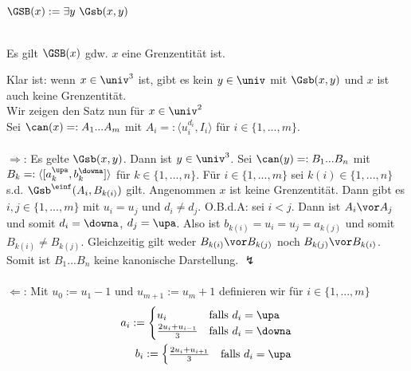
\begin{erin}\ \\
    $\GSB(x) := \exists y\ \Gsb(x,y)$
\end{erin}

\begin{satz}\ \\
    Es gilt $\GSB(x)$ gdw. $x$ eine Grenzentität ist.
\end{satz}

\begin{bew}
    Klar ist: wenn $x \in \univ^3$ ist, gibt es kein $y \in \univ$ mit $\Gsb(x,y)$ und $x$ ist auch keine Grenzentität.\\
    Wir zeigen den Satz nun für $x \in \univ^2$\\
    Sei $\can(x) =: A_1 ... A_m$ mit $A_i =: \langle u_i^{d_i}, I_i \rangle$ für $i \in \{1, ..., m\}$.\\ \ \\
    $\boldsymbol{\Rightarrow}$: 
    Es gelte $\Gsb(x,y)$.
    Dann ist $y \in \univ^3$.
    Sei $\can(y) =: B_1 ... B_n$ mit $B_k =: \langle [a_k^\upa,b_k^\downa] \rangle$ für $k \in \{1, ..., n\}$.
    Für $i \in \{1, ..., m\}$ sei $k(i) \in \{1, ..., n\}$ s.d. $\Gsb^\einf(A_i,B_{k(i)})$ gilt.
    Angenommen $x$ ist keine Grenzentität.
    Dann gibt es $i,j \in \{1, ..., m\}$ mit $u_i = u_j$ und $d_i \neq d_j$. O.B.d.A: sei $i<j$. Dann ist $A_i \vor A_j$ und somit $d_i = \downa$, $d_j = \upa$.
    Also ist $b_{k(i)} = u_i = u_j = a_{k(j)}$ und somit $B_{k(i)} \neq B_{k(j)}$. Gleichzeitig gilt weder $B_{k(i)} \vor B_{k(j)}$ noch $B_{k(j)} \vor B_{k(i)}$. 
    Somit ist $B_1 ... B_n$ keine kanonische Darstellung. $\lightning$\\ \ \\
    $\boldsymbol{\Leftarrow}$:
    Mit $u_0 := u_1-1$ und $u_{m+1} := u_m+1$ definieren wir für $i \in \{1, ..., m\}$
    \begin{align*}
        a_i := 
            \begin{cases}
                u_i & \text{falls $d_i = \upa$}\\
                \frac{2u_i + u_{i-1}}{3} & \text{falls $d_i = \downa$}
            \end{cases}\\
        b_i := 
            \begin{cases}
                \frac{2u_i + u_{i+1}}{3} & \text{falls $d_i = \upa$}\\

\end{cases}
\end{align*}
\end{bew}
